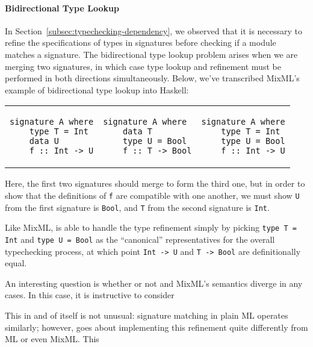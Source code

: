 \paragraph{Bidirectional Type Lookup}

In Section~\ref{subsec:typechecking-dependency}, we observed that
it is necessary to refine the specifications of types in signatures
before checking if a module matches a signature.  The bidirectional
type lookup problem arises when we are merging two signatures, in
which case type lookup and refinement must be performed in both
directions simultaneously.  Below, we've transcribed MixML's
example of bidirectional type lookup into Haskell:

\begin{tabular}{p{} p{} p{}}
\begin{verbatim}
signature A where
    type T = Int
    data U
    f :: Int -> U
\end{verbatim}
&
\begin{verbatim}
signature A where
    data T
    type U = Bool
    f :: T -> Bool
\end{verbatim}
&
\begin{verbatim}
signature A where
    type T = Int
    type U = Bool
    f :: Int -> U
\end{verbatim}
\end{tabular}

Here, the first two signatures should merge to form the third one,
but in order to show that the definitions of \verb|f| are compatible
with one another, we must show \verb|U| from the first signature is
\verb|Bool|, and \verb|T| from the second signature is \verb|Int|.

\noindent
Like MixML, \Backpack{} is able to handle the type refinement simply
by picking \verb|type T = Int| and \verb|type U = Bool| as the ``canonical''
representatives for the overall typechecking process, at which point
\verb|Int -> U| and \verb|T -> Bool| are definitionally equal.

An interesting question is whether or not \Backpack{} and MixML's semantics
diverge in any cases.  In this case, it is instructive to consider



This in and of itself
is not unusual: signature matching in plain ML operates similarly;
however, \Backpack{} goes about implementing this refinement quite differently
from ML or even MixML\@.  This 


